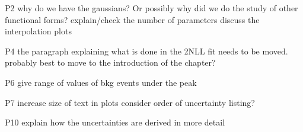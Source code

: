 P2 
why do we have the gaussians? Or possibly why did we do the study of other functional forms?
explain/check the number of parameters
discuss the interpolation plots

P4
the paragraph explaining what is done in the 2NLL fit needs to be moved. 
probably best to move to the introduction of the chapter?

P6
give range of values of bkg events under the peak

P7 
increase size of text in plots
consider order of uncertainty listing?

P10
explain how the uncertainties are derived in more detail

